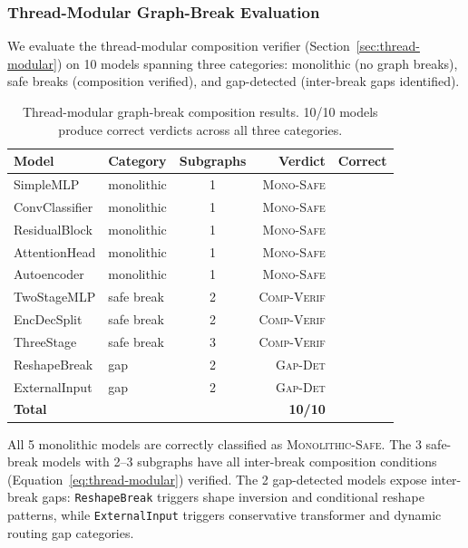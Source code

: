 \documentclass[11pt]{article}
\newcommand{\cmark}{\ding{51}}
\begin{document}
\subsubsection{Thread-Modular Graph-Break Evaluation}

We evaluate the thread-modular composition verifier
(Section~\ref{sec:thread-modular}) on 10 models spanning three categories:
monolithic (no graph breaks), safe breaks (composition verified), and
gap-detected (inter-break gaps identified).

\begin{table}[h]
\centering
\caption{Thread-modular graph-break composition results.
  10/10 models produce correct verdicts across all three categories.}
\label{tab:thread-modular}
\small
\begin{tabular}{@{}llcrl@{}}
\toprule
\textbf{Model} & \textbf{Category} & \textbf{Subgraphs} &
  \textbf{Verdict} & \textbf{Correct} \\
\midrule
SimpleMLP          & monolithic  & 1 & \textsc{Mono-Safe}   & \cmark \\
ConvClassifier     & monolithic  & 1 & \textsc{Mono-Safe}   & \cmark \\
ResidualBlock      & monolithic  & 1 & \textsc{Mono-Safe}   & \cmark \\
AttentionHead      & monolithic  & 1 & \textsc{Mono-Safe}   & \cmark \\
Autoencoder        & monolithic  & 1 & \textsc{Mono-Safe}   & \cmark \\
TwoStageMLP        & safe break  & 2 & \textsc{Comp-Verif}  & \cmark \\
EncDecSplit        & safe break  & 2 & \textsc{Comp-Verif}  & \cmark \\
ThreeStage         & safe break  & 3 & \textsc{Comp-Verif}  & \cmark \\
ReshapeBreak       & gap         & 2 & \textsc{Gap-Det}     & \cmark \\
ExternalInput      & gap         & 2 & \textsc{Gap-Det}     & \cmark \\
\midrule
\textbf{Total}     &             &   & \textbf{10/10}       & \\
\bottomrule
\end{tabular}
\end{table}

All 5 monolithic models are correctly classified as \textsc{Monolithic-Safe}.
The 3 safe-break models with 2--3 subgraphs have all inter-break
composition conditions (Equation~\ref{eq:thread-modular}) verified.
The 2 gap-detected models expose inter-break gaps: \texttt{ReshapeBreak}
triggers shape inversion and conditional reshape patterns, while
\texttt{ExternalInput} triggers conservative transformer and dynamic
routing gap categories.
\end{document}
